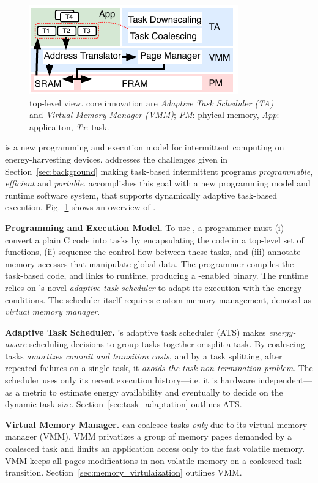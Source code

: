 \begin{figure}
	\centering
	\includegraphics[width=\columnwidth]{figures/system_overview.pdf}
	\caption{\sys top-level view. \sys core innovation are \emph{Adaptive Task Scheduler (TA)} and \emph{Virtual Memory Manager (VMM)}; \emph{PM}: phyical memory, \emph{App}: applicaiton, \emph{Tx}: task.}
	\label{fig:system_overview}
\end{figure}

\sys is a new programming and execution model for intermittent computing on energy-harvesting devices. \sys addresses the challenges given in Section~\ref{sec:background} making task-based intermittent programs {\em programmable}, {\em efficient} and {\em portable}. \sys accomplishes this goal with a new programming model and runtime software system, that supports dynamically adaptive task-based execution. Fig.~\ref{fig:system_overview} shows an overview of \sys.

\textbf{Programming and Execution Model.}  To use \sys, a programmer must (i) convert a plain C code into tasks by encapsulating the code in a top-level set of functions, (ii) sequence the control-flow between these tasks, and (iii) annotate memory accesses that manipulate global data. The programmer compiles the task-based code, and links to \sys runtime, producing a \sys-enabled binary. The runtime relies on \sys's novel {\em adaptive task scheduler} to adapt its execution with the energy conditions. The scheduler itself requires custom memory management, denoted as {\em virtual memory manager}.

\textbf{Adaptive Task Scheduler.} \sys's adaptive task scheduler (ATS) makes \emph{energy-aware} scheduling decisions to group tasks together or split a task. By coalescing tasks \sys \emph{amortizes commit and transition costs}, and by a task splitting, after repeated failures on a single task, it \emph{avoids the task non-termination problem}. The scheduler uses only its recent execution history---i.e. it is hardware independent---as a metric to estimate energy availability and eventually to decide on the dynamic task size. Section~\ref{sec:task_adaptation} outlines ATS.

\textbf{Virtual Memory Manager.} \sys can coalesce tasks \emph{only} due to its virtual memory manager (VMM). VMM privatizes a group of memory pages demanded by a coalesced task and limits an application access only to the fast volatile memory. VMM keeps all pages modifications in non-volatile memory on a coalesced task transition. Section~\ref{sec:memory_virtulaization} outlines VMM.